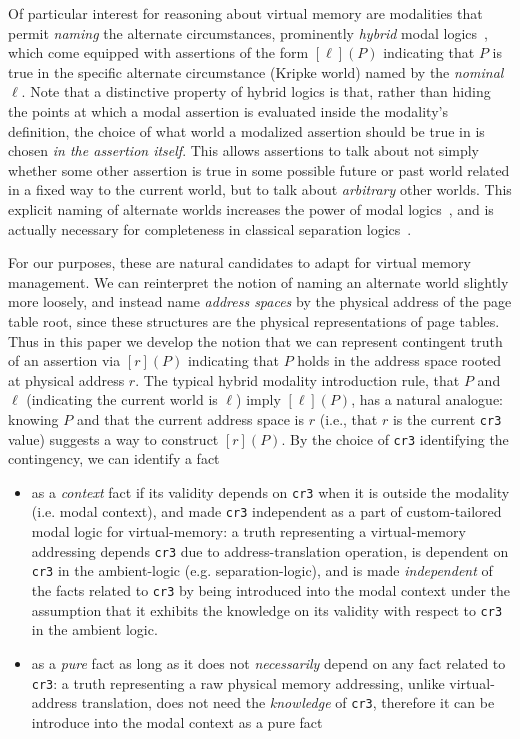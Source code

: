 \documentclass[acmsmall,screen,nonacm]{acmart}
\begin{document}
Of particular interest for reasoning about virtual memory are modalities that permit \emph{naming} the alternate 
circumstances, prominently \emph{hybrid} modal logics~\cite{blackburn1995hybrid,areces2001hybrid}, which come equipped 
with assertions of the form $[\ell](P)$ indicating that $P$ is true in the specific alternate circumstance (Kripke world)
 named by the \emph{nominal} $\ell$. Note that a distinctive property of hybrid logics is that, rather than hiding
the points at which a modal assertion is evaluated inside the modality's definition, the choice of what world a modalized
assertion should be true in is chosen \emph{in the assertion itself}. This allows assertions to talk about not simply whether some other assertion
is true in some possible future or past world related in a fixed way to the current world, but to talk about \emph{arbitrary}
other worlds. This explicit naming of alternate worlds increases the power of modal logics~\cite{blackburn1995hybrid}, and is actually
necessary for completeness in classical separation logics~\cite{brotherston2014parametric}.

For our purposes, these are natural candidates to adapt for virtual memory management. We can reinterpret the notion of 
naming an alternate world slightly more loosely, and instead name \emph{address spaces} by the physical address of the 
page table root, since these structures are the physical representations of page tables. Thus in this paper we develop 
the notion that we can represent contingent truth of an assertion via $[r](P)$ indicating that $P$ holds in the address 
space rooted at physical address $r$.
The typical hybrid modality introduction rule, that $P$ and $\ell$ (indicating the current world is $\ell$) imply 
$[\ell](P)$, has a natural analogue: knowing $P$ and that the current address space is $r$ (i.e., that $r$ is the 
current \texttt{cr3} value) suggests a way to construct $[r](P)$. By the choice of \texttt{cr3} identifying the contingency, we can identify a fact
\begin{itemize}
  \item as a \textit{context} fact if its validity depends on \texttt{cr3} when it is outside the modality (i.e. modal context), and made \texttt{cr3} independent as a part of custom-tailored modal logic for virtual-memory: a truth representing a virtual-memory addressing depends \texttt{cr3} due to address-translation operation, is dependent on \texttt{cr3} in the ambient-logic (e.g. separation-logic), and is made \textit{independent} of the facts related to \texttt{cr3} by being introduced into the modal context under the assumption that it exhibits the knowledge on its validity with respect to \texttt{cr3} in the ambient logic.
  \item as a \textit{pure} fact as long as it does not \textit{necessarily} depend on any fact related to \texttt{cr3}: a truth representing a raw physical memory addressing, unlike virtual-address translation, does not need the \textit{knowledge} of \texttt{cr3}, therefore it can be introduce into the modal context as a pure fact
\end{itemize}
\end{document}
